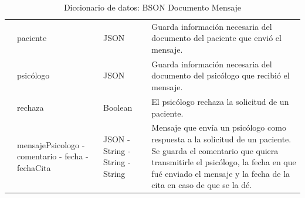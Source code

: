 \begin{table}[htpb]
\begin{tabularx}{\textwidth}{|l|X|X|X|}
                  & paciente                                                                                        & JSON                                                                             & Guarda información necesaria del documento del paciente que envió el mensaje.                                                                                                                                                    \\ \cline{2-4} 
                  & psicólogo                                                                                       & JSON                                                                             & Guarda información necesaria del documento del psicólogo que recibió el mensaje.                                                                                                                                                 \\ \cline{2-4} 
                  & rechaza                                                                                         & Boolean                                                                          & El psicólogo rechaza la solicitud de un paciente.                                                                                                                                                                                \\ \cline{2-4} 
                  & mensajePsicologo - comentario - fecha - fechaCita                                               & JSON - String - String - String                                                  & Mensaje que envía un psicólogo como respuesta a la solicitud de un paciente. Se guarda el comentario que quiera transmitirle el psicólogo, la fecha en que fué enviado el mensaje y la fecha de la cita en caso de que se la dé. \\ \hline
\end{tabularx}
\caption{Diccionario de datos: BSON Documento Mensaje}
\label{fig:dic_datos_BSON_1}
\end{table}

